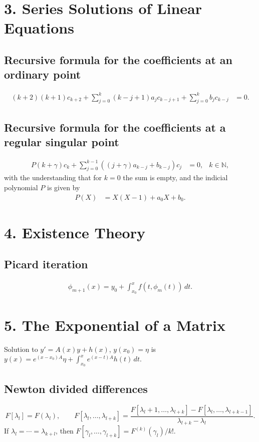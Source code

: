 \section*{3. Series Solutions of Linear Equations}

\subsection*{Recursive formula for the coefficients at an ordinary point}
\begin{align*}
    (k+2)(k+1)c_{k+2} + \sum_{j=0}^{k} (k-j+1)a_jc_{k-j+1} + \sum_{j=0}^{k}b_jc_{k-j} &= 0. 
\end{align*}

\subsection*{Recursive formula for the coefficients at a regular singular point}
\begin{align*}
P(k+\gamma)c_k + \sum_{j=0}^{k-1} ((j+\gamma)a_{k-j} + b_{k-j}) c_j &=0, &k\in \mathbb N,
\end{align*}
with the understanding that for $k=0$ the sum is empty, and the indicial 
polynomial $P$ is given by 
\begin{align*}
 P(X) &= X(X-1) + a_0X + b_0.
\end{align*}

\section*{4. Existence Theory}

\subsection*{Picard iteration}
\begin{align*}
  \phi_{m+1}(x) = y_0 + \int_{x_0}^x f(t,\phi_m(t))\, dt.
\end{align*}

\section*{5. The Exponential of a Matrix}

Solution to $y'=A(x)y+h(x)$, $y(x_0)=\eta$ is 
$y(x) = e^{(x-x_0)A}\eta + \int_{x_0}^x e^{(x-t)A}h(t)\, dt$.

\subsection*{Newton divided differences}
\[
    F[\lambda_l] = F(\lambda_l), \qquad
    F[\lambda_l,\ldots,\lambda_{l+k}] = 
    \frac{F[\lambda_l+1,\ldots,\lambda_{l+k}]-F[\lambda_l,\ldots,
    \lambda_{l+k-1}]}{\lambda_{l+k}-\lambda_l}.
\]
If $\lambda_l=\cdots = \lambda_{k+l}$, then 
$F[\gamma_l,\ldots,\gamma_{l+k}] = F^{(k)}(\gamma_l)/k!$.


